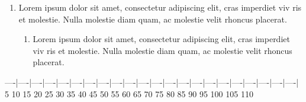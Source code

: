 
\begin{enumerate}[label=(\alph*)]
    \item Lorem ipsum dolor sit amet, consectetur adipiscing elit, cras
          imperdiet viv ris et molestie. Nulla molestie diam quam, ac molestie
          velit rhoncus placerat.
          \begin{enumerate}[label=(\roman*)]
              \item Lorem ipsum dolor sit amet, consectetur adipiscing elit,
                    cras imperdiet viv ris et molestie. Nulla molestie diam
                    quam, ac molestie velit rhoncus placerat.
          \end{enumerate}
\end{enumerate}

----|----|----|----|----|----|----|----|----|----|----|----|----|----|----|----|----|----|----|----|----|----|
   5   10   15   20   25   30   35   40   45   50   55   60   65   70   75   80   85   90   95   100   105   110
